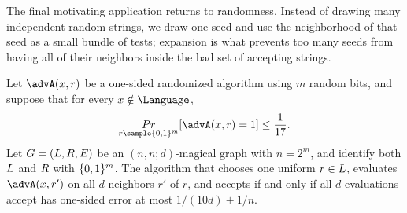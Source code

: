 The final motivating application returns to randomness. Instead of drawing many independent random strings, we draw one seed and use the neighborhood of that seed as a small bundle of tests; expansion is what prevents too many seeds from having all of their neighbors inside the bad set of accepting strings.

\begin{theorem}
	\label{thm:magical-error-reduction}
	Let \(\advA(x,r)\) be a one-sided randomized algorithm using \(m\) random bits, and suppose that for every \(x\notin \Language\),
	\begin{equation}
		\label{eq:magical-error-original}
		\Pr_{r\sample\bits^m}[\advA(x,r)=1]\leq \frac{1}{17}.
	\end{equation}
	Let \(G=(L,R,E)\) be an \((n,n;d)\)-magical graph with \(n=2^m\), and identify both \(L\) and \(R\) with \(\{0,1\}^m\). The algorithm that chooses one uniform \(r\in L\), evaluates \(\advA(x,r')\) on all \(d\) neighbors \(r'\) of \(r\), and accepts if and only if all \(d\) evaluations accept has one-sided error at most \(1/(10d)+1/n\).
\end{theorem}

